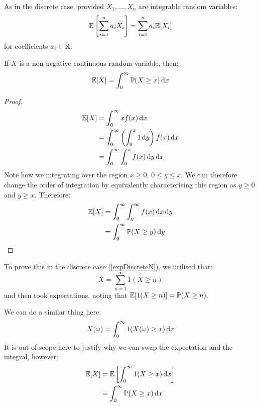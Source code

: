 \documentclass[../main.tex]{subfiles}
\begin{document}
\begin{remark}
  As in the discrete case, provided $X_1, \ldots, X_n$ are integrable random variables:
  \[
    \mathbb{E}\left[\sum_{i = 1}^{n} a_iX_i\right] = \sum_{i = 1}^{n} a_i \mathbb{E}[X_i]
  \]
  for coefficients $a_i \in \mathbb{R}$.
\end{remark}
\begin{lemma}
  If $X$ is a non-negative continuous random variable, then:
  \label{expectationCDF}
  \[
    \E[X] = \int_{0}^{\infty} \P(X\geq x) \d{x}
  \]
\end{lemma}
\begin{proof}
  \begin{align*}
    \E[X] &= \int_{0}^{\infty} xf(x) \d{x} \\
          &= \int_{0}^{\infty} \left(\int_{0}^{x} 1 \d{y}\right) f(x) \d{x} \\
          &= \int_{0}^{\infty} \int_{0}^{x} f(x) \d{y}\d{x}
  \end{align*}
  Note how we integrating over the region $x \geq 0$, $0 \leq y \leq x$.
  We can therefore change the order of integration by equivalently characterising this region as $y \geq 0$ and $y \geq x$.
  Therefore:
  \begin{align*}
    \E[X] &= \int_{0}^{\infty} \int_{y}^{\infty} f(x) \d{x} \d{y} \\
          &= \int_{0}^{\infty} \P(X \geq y) \d{y}
  \end{align*}
\end{proof}
\begin{remark}
  To prove this in the discrete case (\cref{expDiscreteN}), we utilised that:
  \[
    X = \sum_{n = 1}^{\infty} 1(X\geq n)
  \]
  and then took expectations, noting that $\mathbb{E}[1(X \geq n)] = \mathbb{P}(X \geq n)$.

  We can do a similar thing here:
  \begin{align*}
    X(\omega) = \int_{0}^{\infty} 1(X(\omega) \geq x) \d{x}
  \end{align*}
  It is out of scope here to justify why we can swap the expectation and the integral, however:
  \begin{align*}
    \E[X] &= \E\left[\int_{0}^{\infty} 1(X \geq x) \d{x}\right] \\
          &= \int_{0}^{\infty} \P(X \geq x) \d{x}
  \end{align*}
\end{remark}
\end{document}
